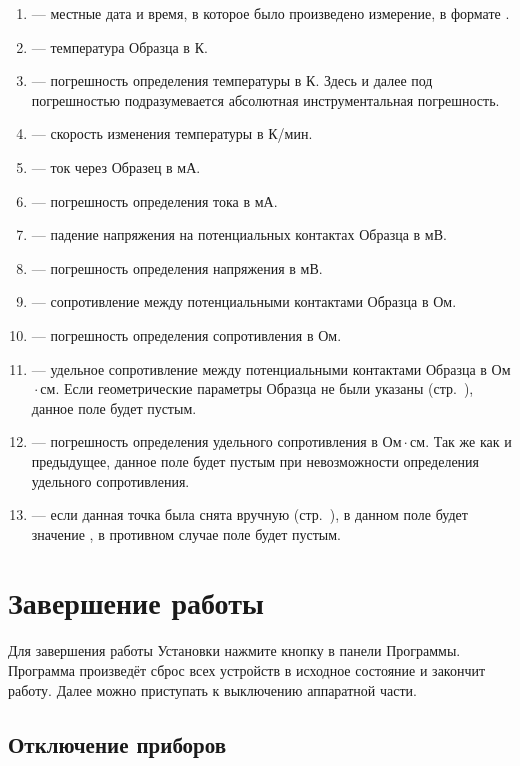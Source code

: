 \documentclass[12pt, a4paper, twocolumn]{report}
\begin{document}
\begin{enumerate}
\item {} --- местные дата и время, в которое было произведено измерение, в формате \mbox{}.
\item {} --- температура Образца в К.
\item \CMD{+/-} --- погрешность определения температуры в К. Здесь и далее под погрешностью подразумевается абсолютная инструментальная погрешность.
\item {} --- скорость изменения температуры в К/мин.
\item {} --- ток через Образец в мА.
\item \CMD{+/-} --- погрешность определения тока в мА.
\item {} --- падение напряжения на потенциальных контактах Образца в мВ.
\item \CMD{+/-} --- погрешность определения напряжения в мВ.
\item {} --- сопротивление между потенциальными контактами Образца в Ом.
\item \CMD{+/-} --- погрешность определения сопротивления в Ом.
\item {} --- удельное сопротивление между потенциальными контактами Образца в Ом${}\cdot{}$см. Если геометрические параметры Образца не были указаны (стр.~\pageref{sec_geom_params}), данное поле будет пустым.
\item \CMD{+/-} --- погрешность определения удельного сопротивления в Ом${}\cdot{}$см. Так же как и предыдущее, данное поле будет пустым при невозможности определения удельного сопротивления.
\item {} --- если данная точка была снята вручную (стр.~\pageref{sec_manual}), в данном поле будет значение , в противном случае поле будет пустым.
\end{enumerate}

\chapter{Завершение работы}

Для завершения работы Установки нажмите кнопку  в панели Программы. Программа произведёт сброс всех устройств в исходное состояние и закончит работу. Далее можно приступать к выключению аппаратной части.

\section{Отключение приборов}
\end{document}
